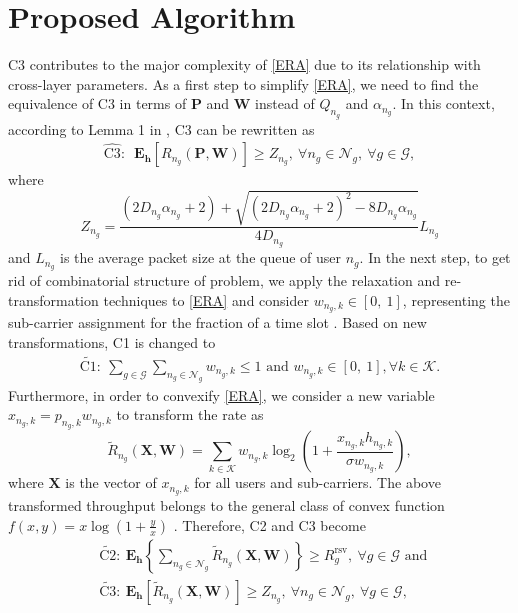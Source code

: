 \documentclass[journal,draftclsnofoot,12pt,onecolumn]{IEEEtran}
\begin{document}
\section{Proposed Algorithm}
{C3 contributes to the major complexity of \eqref{ERA}
due to its relationship with cross-layer parameters}. As a first
step to simplify \eqref{ERA}, we need to find the equivalence of C3
in terms of $\textbf{P}$ and $\textbf{W}$ instead of $Q_{n_g}$ and $
{\alpha}_{n_g}$. {In this context, according to Lemma 1 in
\cite{4290029}, C3 can be rewritten as
\begin{align}
\widehat{\text{C3}}: \,\,\,\textbf{E}_{\textbf{h}}\left[R_{n_g}(\textbf{P},\textbf{W})\right]  \geq Z_{n_g},~\forall n_g \in \mathcal{N}_g,~\forall g \in \mathcal{G},\nonumber
\end{align}}
where $$Z_{n_g} = \frac{ (2 {D}_{n_g} {\alpha}_{n_g} + 2)  + \sqrt{ (2 {D}_{n_g} {\alpha}_{n_g} + 2)^2 - 8 {D}_{n_g} {\alpha}_{n_g}}}{4 {D}_{n_g}} {L}_{n_g}$$ and $ {L}_{n_g}$ is the average packet size at the queue of user $n_g$. {In the next step,} to get rid of combinatorial structure of problem, we apply the relaxation and re-transformation techniques to \eqref{ERA} {and consider} $w_{n_g,k} \in [0,~1]$,  representing the sub-carrier assignment for the fraction of a time slot \cite{6884195}. {Based on new transformations,} C1 is changed to
\begin{align}
\widetilde{\text{C1}}:~ \sum\limits_{g\in \mathcal{G}}\sum\limits_{n_g \in \mathcal{N}_g}w_{n_g,k}\leq 1 \text{ and } w_{n_g,k} \in [0,~1], \forall k \in \mathcal{K}\nonumber.
\end{align}
Furthermore, in order to convexify \eqref{ERA}, we consider a new variable $x_{n_g,k} = p_{n_g,k}w_{n_g,k}$ to transform the rate as $$\widetilde{R}_{n_g}(\textbf{X},\textbf{W}) = \sum\limits_{k \in \mathcal{K}}w_{n_g,k}\log_2(1 + \frac{x_{n_g,k}h_{n_g,k}}{\sigma w_{n_g,k}}),$$ where $\textbf{X}$ is the vector of $x_{n_g,k}$ for all users and sub-carriers. The above transformed throughput belongs to the general class of convex function $f(x,y) = x\log(1 + \frac{y}{x})$ \cite{6251827,6364677}. {Therefore,} C2 and C3 become
\begin{align}
&\widetilde{\text{C2}}:~ \textbf{E}_{\textbf{h}}\left\lbrace \sum\limits_{n_g \in \mathcal{N}_g}\widetilde{R}_{n_g}(\textbf{X},\textbf{W})\right\rbrace   \geq R_g^\text{rsv}, ~\forall g \in \mathcal{G} \text{ and }\nonumber\\
&\widetilde{\text{C3}}:~ \textbf{E}_{\textbf{h}}\left[\widetilde{R}_{n_g}(\textbf{X},\textbf{W})\right]  \geq Z_{n_g},~\forall n_g \in \mathcal{N}_g,~\forall g \in \mathcal{G},\nonumber
\end{align}
\end{document}
